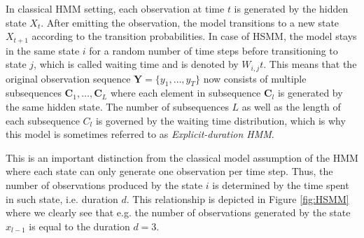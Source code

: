 In classical HMM setting, each observation at time $t$ is generated by the hidden state $X_t$. After emitting the observation, the model transitions to a new state $X_{t+1}$ according to 
the transition probabilities. In case of HSMM, the model stays in the same state $i$ for a random number of time steps before transitioning to state $j$, which is called waiting time and is denoted by $W_{i,j}t$.
This means that the original observation sequence $\textbf{Y} = \{y_1,\ldots,y_T\}$ now consists of multiple subsequences $\textbf{C}_1,\ldots,\textbf{C}_L$ where each element in subsequence $\textbf{C}_l$ is generated by the same hidden state. \citep{Dasu2011}
The number of subsequences $L$ as well as the length of each subsequence $C_l$ is governed by the waiting time distribution, which is why this model is sometimes referred to as \textit{Explicit-duration HMM}. \citep{Yu2015} 

This is an important distinction from the classical model assumption of the HMM where each state can only generate one observation per time step. Thus, the number of observations produced by the state $i$ is determined by the time spent in such state, i.e. duration $d$. 
This relationship is depicted in Figure \ref{fig:HSMM} where we clearly see that e.g. the number of observations generated by the state $x_{l-1}$ is equal to the duration $d=3$. 


